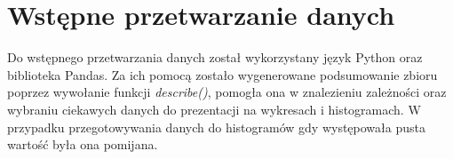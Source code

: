 \documentclass{classrep}
\begin{document}
    \section{Wstępne przetwarzanie danych} {
        Do wstępnego przetwarzania danych został wykorzystany język Python oraz
        biblioteka Pandas. Za ich pomocą zostało wygenerowane podsumowanie zbioru
        poprzez wywołanie funkcji \emph{describe()}, pomogła ona w znalezieniu
        zależności oraz wybraniu ciekawych danych do prezentacji na wykresach i
        histogramach. W przypadku przegotowywania danych do histogramów gdy występowała
        pusta wartość była ona pomijana.
    }

    \begin{thebibliography}{0}
    \end{thebibliography}
\end{document}
